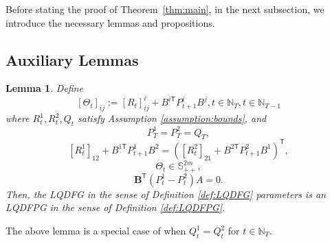 \documentclass[letterpaper, 10 pt, conference]{ieeeconf}  %
\newcommand{\transpose}{\mathsf{T}}
\newtheorem{lemma}{Lemma}
\begin{document}






\appendix
Before stating the proof of Theorem~\ref{thm:main}, in the next subsection, we introduce the necessary lemmas and propositions. 
\subsection{Auxiliary Lemmas}
\begin{lemma}
    Define
        \begin{equation}\label{eq:Theta}
        [\Theta_{t}]_{ij} := [R_{t}]^{i}_{ij} + B^{i\transpose}P_{t+1}^{i}B^{j},t\in \mathbb{N}_{T},t\in\mathbb{N}_{T-1}
        \end{equation}
    where $R_{t}^{1},R_{t}^{2},Q_{t}$ satisfy Assumption \ref{assumption:bounds}, and
    \begin{equation*}
        P_{T}^{1} = P_{T}^{2}=Q_{T},
    \end{equation*}
        \begin{equation}\label{eq:costFPDG1}
            [R_{t}^{1}]_{12} + B^{1\transpose}P_{t+1}^{1}B^{2} = ([R_{t}^{2}]_{21} + B^{2\transpose}P_{t+1}^{2}B^{1})^{\transpose},
        \end{equation}
        \begin{equation}\label{eq:costFPDG2}
            \Theta_{t} \in \mathbb{S}_{++}^{2m},
        \end{equation}
        \begin{equation}\label{eq:costFPDG3}
            \mathbf{B}^{\transpose}(P_{t}^{1}-P_{t}^{2})A=0.
        \end{equation}
    Then, the LQDFG in the sense of Definition \ref{def:LQDFG} parameters is an LQDFPG in the sense of Definition \ref{def:LQDFPG}.
\end{lemma}
The above lemma is a special case of \cite[Theorem 6]{prasad_structure_2023} when $Q_{t}^{1}=Q_{t}^{2}$ for $t\in \mathbb{N}_T$.
\end{document}
